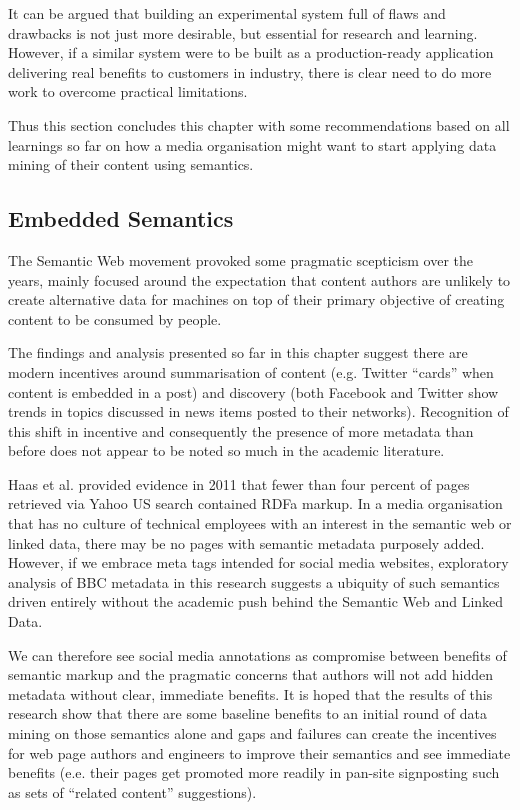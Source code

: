 It can be argued that building an experimental system full of flaws
and drawbacks is not just more desirable, but essential for research
and learning.
However, if a similar system were to be built as a production-ready
application delivering real benefits to customers in industry, there
is clear need to do more work to overcome practical limitations.

Thus this section concludes this chapter with some recommendations
based on all learnings so far on how a media organisation might
want to start applying data mining of their content using semantics.

\subsection{Embedded Semantics}

The Semantic Web movement provoked some pragmatic
scepticism\cite{marshall2003semantic} over the years, mainly focused
around the expectation that content authors are unlikely to create
alternative data for machines on top of their primary objective of
creating content to be consumed by people.

The findings and analysis presented so far in this chapter suggest
there are modern incentives around summarisation of content
(e.g. Twitter ``cards'' when content is embedded in a post) and
discovery (both Facebook and Twitter show trends in topics discussed
in news items posted to their networks). Recognition of this shift
in incentive and consequently the presence of more metadata than
before does not appear to be noted so much in the academic literature.

Haas et al.\cite{haas2011enhanced} provided evidence in 2011 that
fewer than four percent of pages retrieved via Yahoo US search
contained RDFa markup. In a media organisation that has no culture
of technical employees with an interest in the semantic web or
linked data, there may be no pages with semantic metadata purposely
added. However, if we embrace meta tags intended for social media
websites, exploratory analysis of BBC metadata in this research
suggests a ubiquity of such semantics driven entirely without the
academic push behind the Semantic Web and Linked Data.

We can therefore see social media annotations as compromise between
benefits of semantic markup and the pragmatic concerns that authors
will not add hidden metadata without clear, immediate benefits. It is
hoped that the results of this research show that there are some
baseline benefits to an initial round of data mining on those
semantics alone and gaps and failures can create the incentives for
web page authors and engineers to improve their semantics and see
immediate benefits (e.e. their pages get promoted more readily in
pan-site signposting such as sets of ``related content'' suggestions).

